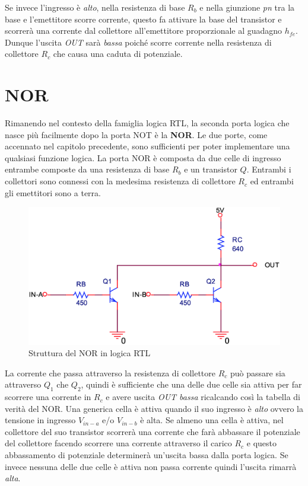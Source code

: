 \documentclass[12pt, a4paper]{report}
\begin{document}
Se invece l'ingresso è \textit{alto}, nella resistenza di base $R_b$ e nella giunzione \textit{pn} tra la base e l'emettitore scorre corrente, questo fa attivare la base del transistor e scorrerà una corrente dal collettore all'emettitore proporzionale al guadagno $h_{fe}$. Dunque l'uscita \textit{OUT} sarà \textit{bassa} poiché scorre corrente nella resistenza di collettore $R_c$ che causa una caduta di potenziale.

\section{NOR}
Rimanendo nel contesto della famiglia logica RTL, la seconda porta logica che nasce più facilmente dopo la porta NOT è la \textbf{NOR}. Le due porte, come accennato nel capitolo precedente, sono sufficienti per poter implementare una qualsiasi funzione logica. La porta NOR è composta da due celle di ingresso entrambe composte da una resistenza di base $R_b$ e un transistor $Q$. Entrambi i collettori sono connessi con la medesima resistenza di collettore $R_c$ ed entrambi gli emettitori sono a terra.
\begin{figure}[h]
    \centering
    \includegraphics[scale=0.4,angle=0]{rtl_nor.png}
    \caption{Struttura del NOR in logica RTL}
\end{figure}

La corrente che passa attraverso la resistenza di collettore $R_c$ può passare sia attraverso $Q_1$ che $Q_2$, quindi è sufficiente che una delle due celle sia attiva per far scorrere una corrente in $R_{c}$ e avere uscita \textit{OUT bassa} ricalcando così la tabella di verità del NOR. Una generica cella è attiva quando il suo ingresso è \textit{alto} ovvero la tensione in ingresso $V_{in-a}$ e/o $V_{in-b}$ è alta. Se almeno una cella è attiva, nel collettore del suo transistor scorrerà una corrente che farà abbassare il potenziale del collettore facendo scorrere una corrente attraverso il carico $R_c$ e questo abbassamento di potenziale determinerà un'uscita bassa dalla porta logica. Se invece nessuna delle due celle è attiva non passa corrente quindi l'uscita rimarrà \textit{alta}.
\end{document}
